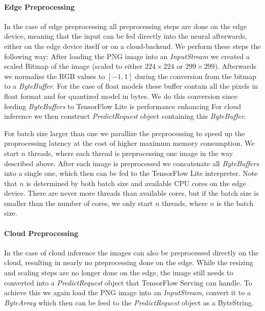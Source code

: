 \paragraph{Edge Preprocessing}
In the case of edge preprocessing all preprocessing steps are done on the edge device, meaning that the input can be fed directly into the neural afterwards, either on the edge device itself or on a cloud-backend.
We perform these steps the following way: After loading the PNG image into an \emph{InputStream} we created a scaled Bitmap of the image (scaled to either $224\times224$ or $299\times299$). 
Afterwards we normalise the RGB values to $[-1,1]$ during the conversion from the bitmap to a \emph{ByteBuffer}. 
For the case of float models these buffer contain all the pixels in float format and for quantized model in bytes.
We do this conversion since feeding \emph{ByteBuffers} to TensorFlow Lite is performance enhancing %
For cloud inference we then construct \emph{PredictRequest} object containing this \emph{ByteBuffer}.

For batch size larger than one we parallize the preprocessing to speed up the proprocessing latency at the cost of higher maximum memory consumption. We start $n$ threads, where each thread is preprocessing one image in the way described above. After each image is preprocessed we concatenate all \emph{ByteBuffers} into a single one, which then can be fed to the TensorFlow Lite interpreter. Note that $n$ is determined by both batch size and available CPU cores on the edge device. There are never more threads than available cores, but if the batch size is smaller than the number of cores, we only start $n$ threads, where $n$ is the batch size. 

\paragraph{Cloud Preprocessing}

In the case of cloud inference the images can also be preprocessed directly on the cloud, resulting in nearly no preprocessing done on the edge. While the resizing and scaling steps are no longer done on the edge, the image still needs to converted into a \emph{PredictRequest} object that TensorFlow Serving can handle.
To achieve this we again load the PNG image into an \emph{InputStream}, convert it to a \emph{ByteArray} which then can be feed to the \emph{PredictRequest} object as a ByteString. 



